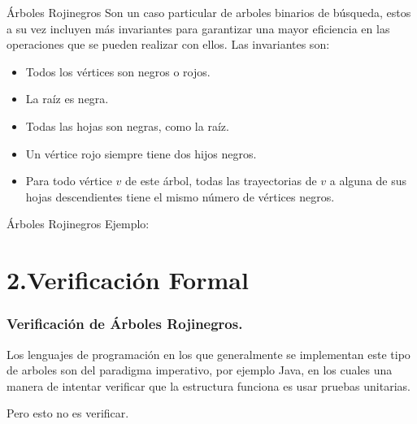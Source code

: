 \documentclass[xcolor=dvipsnames,table,handout]{beamer}
\begin{document}
\begin{frame}{Árboles Rojinegros}
Son un caso particular de arboles binarios de búsqueda, estos a su vez incluyen 
más invariantes para garantizar una mayor eficiencia en las operaciones que se 
pueden realizar con ellos. Las invariantes son:
\begin{itemize}
    \item Todos los vértices son negros o rojos.
    \item La raíz es negra.
    \item Todas las hojas son negras, como la raíz.
    \item Un vértice rojo siempre tiene dos hijos negros.
    \item Para todo vértice $v$ de este árbol, todas las trayectorias de $v$ a 
alguna de sus hojas descendientes tiene el mismo número de vértices negros.
\end{itemize}

\end{frame}

\begin{frame}{Árboles Rojinegros}
Ejemplo:

\centering
\end{frame}


\section{2.Verificación Formal}

\begin{frame}
  \frametitle{Verificación de Árboles Rojinegros.}

  Los lenguajes de programación en los que generalmente se implementan este tipo 
de arboles son del paradigma imperativo, por ejemplo Java, en los cuales una 
manera de
  intentar verificar que la estructura funciona es usar pruebas unitarias.

  \vspace*{10pt}
  \centering Pero esto no es verificar.

\end{frame}
\end{document}
